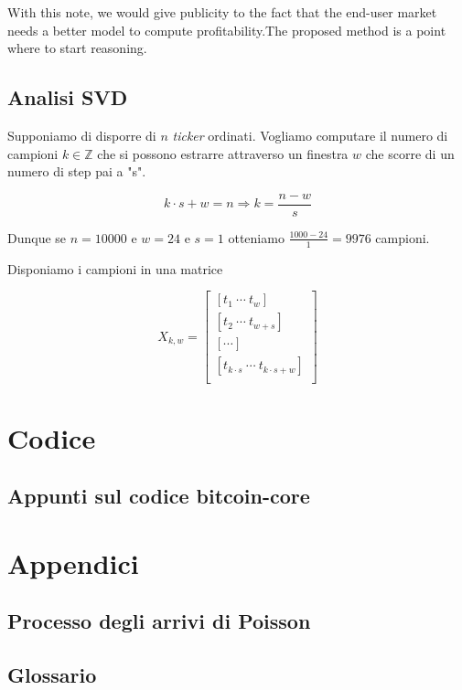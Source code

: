 \documentclass{book}
\theoremstyle{definition}
\begin{document}
With this note, we would give publicity to the fact that the end-user market needs a better model to compute profitability.The proposed method is a point where to start reasoning.

\chapter{Analisi SVD}

Supponiamo di disporre di $n$ \textit{ticker} ordinati.
Vogliamo computare il numero di campioni $k \in \mathbb{Z}$ che si possono estrarre attraverso un finestra $w$ che scorre di un numero di step pai a "s".

\[
    k \cdot s + w = n \Rightarrow k = \frac{n - w}{s}
\]

Dunque se $n = 10000$ e $w = 24$ e $s = 1$ otteniamo $\frac{1000 - 24}{1} = 9976$ campioni.

Disponiamo i campioni in una matrice

\begin{equation*}
    X_{k,w} = 
    \begin{bmatrix}
        [ t_{1} \ \cdots \ t_{w} ] \\
        [ t_{2} \ \cdots \ t_{ w + s} ] \\
        [ \cdots ]\\
        [ t_{k \cdot s} \ \cdots \ t_{ k \cdot s + w } ] \\
    \end{bmatrix}
\end{equation*}

\newpage
\part{Codice}

\chapter{Appunti sul codice bitcoin-core}

\newpage

\part{Appendici}
\appendix
\chapter{Processo degli arrivi di Poisson}

\newpage
\chapter{Glossario}

\newpage


\end{document}
